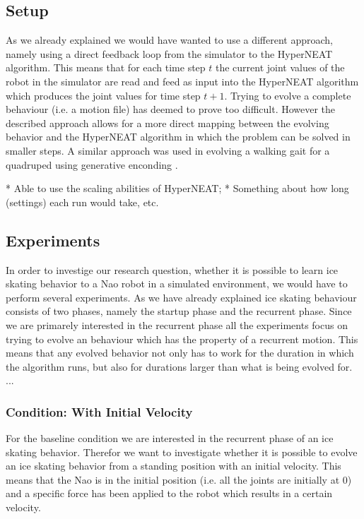 \documentclass[a4paper,10pt]{article}
\begin{document}
\subsection{Setup}
\label{sec:setup}
As we already explained we would have wanted to use a different approach, namely using a direct feedback loop from the simulator to the HyperNEAT algorithm. This means that for each time step $t$ the current joint values of the robot in the simulator are read and feed as input into the HyperNEAT algorithm which produces the joint values for time step $t + 1$. Trying to evolve a complete behaviour (i.e. a motion file) has deemed to prove too difficult. However the described approach allows for a more direct mapping between the evolving behavior and the HyperNEAT algorithm in which the problem can be solved in smaller steps. A similar approach was used in evolving a walking gait for a quadruped using generative enconding \cite{EvolvingCoordinatedQuadrupedQaitsWithTheHyperNEATGenerativeEncoding}.

* Able to use the scaling abilities of HyperNEAT;
* Something about how long (settings) each run would take, etc.

\subsection{Experiments}
In order to investige our research question, whether it is possible to learn ice skating behavior to a Nao robot in a simulated environment, we would have to perform several experiments. As we have already explained ice skating behaviour consists of two phases, namely the startup phase and the recurrent phase. Since we are primarely interested in the recurrent phase all the experiments focus on trying to evolve an behaviour which has the property of a recurrent motion. This means that any evolved behavior not only has to work for the duration in which the algorithm runs, but also for durations larger than what is being evolved for. ...


\subsubsection{Condition: With Initial Velocity}
For the baseline condition we are interested in the recurrent phase of an ice skating behavior. Therefor we want to investigate whether it is possible to evolve an ice skating behavior from a standing position with an initial velocity. This means that the Nao is in the initial position (i.e. all the joints are initially at 0) and a specific force has been applied to the robot which results in a certain velocity. 
\end{document}
